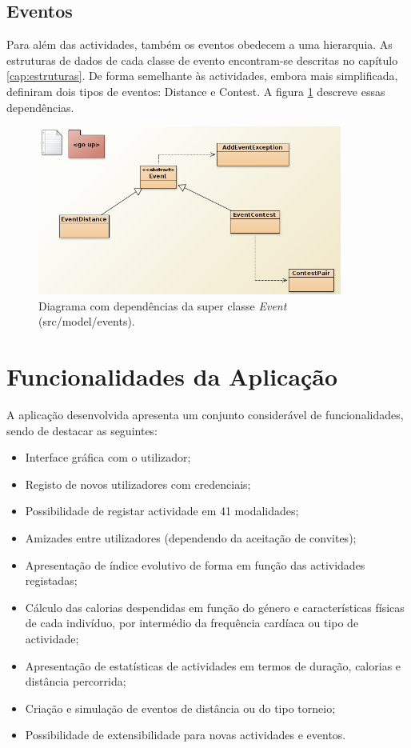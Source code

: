 \documentclass[a4paper,10pt]{report}
\begin{document}
\subsection{Eventos}
\label{subsec:eventosDiagrama}
Para além das actividades, também os eventos obedecem a uma hierarquia.
As estruturas de dados de cada classe de evento encontram-se descritas no capítulo \ref{cap:estruturas}.
De forma semelhante às actividades, embora mais simplificada, definiram dois tipos de eventos: Distance e Contest.
A figura \ref{fig:eventDiagram} descreve essas dependências.

\begin{figure}
\centering
\includegraphics[width=10cm]{events.png}
\caption{Diagrama com dependências da super classe \emph{Event} (src/model/events).}
\label{fig:eventDiagram}
\end{figure}

\section{Funcionalidades da Aplicação}
\label{sec:funcionalidades}
A aplicação desenvolvida apresenta um conjunto considerável de funcionalidades, sendo de destacar as seguintes:

\begin{itemize}
 \item Interface gráfica com o utilizador;
 \item Registo de novos utilizadores com credenciais;
 \item Possibilidade de registar actividade em 41 modalidades;
 \item Amizades entre utilizadores (dependendo da aceitação de convites);
 \item Apresentação de índice evolutivo de forma em função das actividades registadas;
 \item Cálculo das calorias despendidas em função do género e características físicas de cada indivíduo, 
	  por intermédio da frequência cardíaca ou tipo de actividade;
 \item Apresentação de estatísticas de actividades em termos de duração, calorias e distância percorrida;
 \item Criação e simulação de eventos de distância ou do tipo torneio;
 \item Possibilidade de extensibilidade para novas actividades e eventos.
\end{itemize}
\end{document}
